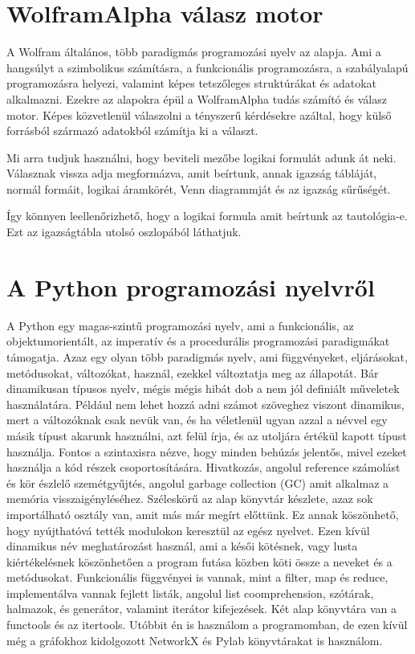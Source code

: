 \documentclass[
]{thesis-ekf}
\theoremstyle{definition}
\theoremstyle{remark}
\begin{document}
	\section{WolframAlpha válasz motor}\label{wolframalpha}
	A Wolfram általános, több paradigmás programozási nyelv az alapja. Ami a hangsúlyt a szimbolikus számításra, a funkcionális programozásra, a szabályalapú programozásra helyezi, valamint képes tetszőleges struktúrákat és adatokat alkalmazni. Ezekre az alapokra épül a WolframAlpha tudás számító és válasz motor. Képes közvetlenül válaszolni a tényszerű kérdésekre azáltal, hogy külső forrásból származó adatokból számítja ki a választ.
	
	Mi arra tudjuk használni, hogy beviteli mezőbe logikai formulát adunk át neki. Válasznak vissza adja megformázva, amit beírtunk, annak igazság tábláját, normál formáit, logikai áramkörét, Venn diagrammját és az igazság sűrűségét.
	
	Így könnyen leellenőrizhető, hogy a logikai formula amit beírtunk az tautológia-e. Ezt az igazságtábla utolsó oszlopából láthatjuk.
	
	\section{A Python programozási nyelvről}\label{python-programnyelv}
	A Python egy magas-szintű programozási nyelv, ami a funkcionális, az objektumorientált, az imperatív és a procedurális programozási paradigmákat támogatja. Azaz egy olyan több paradigmás nyelv, ami függvényeket, eljárásokat, metódusokat, változókat, használ, ezekkel változtatja meg az állapotát. Bár dinamikusan típusos nyelv, mégis mégis hibát dob a nem jól definiált műveletek használatára. Például nem lehet hozzá adni számot szöveghez viszont dinamikus, mert a változóknak csak nevük van, és ha véletlenül ugyan azzal a névvel egy másik típust akarunk használni, azt felül írja, és az utoljára értékül kapott típust használja. Fontos a szintaxisra nézve, hogy minden behúzás jelentős, mivel ezeket használja a kód részek csoportosítására. Hivatkozás, angolul reference számolást és kör észlelő szemétgyűjtés, angolul garbage collection (GC) amit alkalmaz a memória visszaigényléséhez. Széleskörű az alap könyvtár készlete, azaz sok importálható osztály van, amit más már megírt előttünk. Ez annak köszönhető, hogy nyújthatóvá tették modulokon keresztül az egész nyelvet. Ezen kívül dinamikus név meghatározást használ, ami a késői kötésnek, vagy lusta kiértékelésnek köszönhetően a program futása közben köti össze a neveket és a metódusokat. Funkcionális függvényei is vannak, mint a filter, map és reduce, implementálva vannak fejlett listák, angolul list coomprehension, szótárak, halmazok, és generátor, valamint iterátor kifejezések. Két alap könyvtára van a functools és az itertools. Utóbbit én is használom a programomban, de ezen kívül még a gráfokhoz kidolgozott NetworkX és Pylab könyvtárakat is használom.
	
\end{document}
